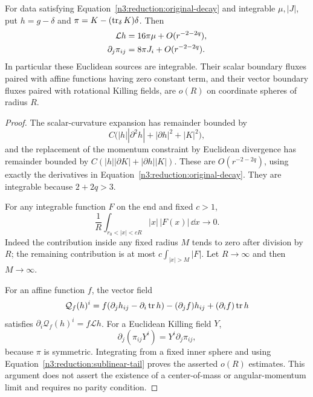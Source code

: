\begin{lemma}
\label{n3:reduction:moment-estimates}
For data satisfying Equation~\eqref{n3:reduction:original-decay} and
integrable $\mu,|J|$, put $h=g-\delta$ and
$\pi=K-(\operatorname{tr}_\delta K)\delta$.  Then
\begin{align}
 \mathcal Lh&=16\pi\mu+O(r^{-2-2q}),\notag\\
 \partial_j\pi_{ij}&=8\pi J_i+O(r^{-2-2q}).
       \label{n3:reduction:linear-source-integrability}
\end{align}
In particular these Euclidean sources are integrable.  Their scalar
boundary fluxes paired with affine functions having zero constant term,
and their vector boundary fluxes paired with rotational Killing fields,
are $o(R)$ on coordinate spheres of radius $R$.
\end{lemma}

\begin{proof}
The scalar-curvature expansion has remainder bounded by
\[
 C\bigl(|h||\partial^2h|+|\partial h|^2+|K|^2\bigr),
\]
and the replacement of the momentum constraint by Euclidean divergence
has remainder bounded by
$C(|h||\partial K|+|\partial h||K|)$.  These are
$O(r^{-2-2q})$, using exactly the derivatives in
Equation~\eqref{n3:reduction:original-decay}.  They are integrable because
$2+2q>3$.

For any integrable function $F$ on the end and fixed $c>1$,
\begin{equation}
 \label{n3:reduction:sublinear-tail}
 \frac1R\int_{r_0<|x|<cR}|x|\,|F(x)|\,\dd x\longrightarrow0.
\end{equation}
Indeed the contribution inside any fixed radius $M$ tends to zero
after division by $R$; the remaining contribution is at most
$c\int_{|x|>M}|F|$.  Let $R\to\infty$ and then $M\to\infty$.

For an affine function $f$, the vector field
\[
 \mathcal Q_f(h)^i
  =f(\partial_jh_{ij}-\partial_i\operatorname{tr} h)
       -(\partial_jf)h_{ij}+(\partial_if)\operatorname{tr} h
\]
satisfies $\partial_i\mathcal Q_f(h)^i=f\mathcal Lh$.
For a Euclidean Killing field $Y$,
\[
 \partial_j(\pi_{ij}Y^i)=Y^i\partial_j\pi_{ij},
\]
because $\pi$ is symmetric.  Integrating from a fixed inner sphere and
using Equation~\eqref{n3:reduction:sublinear-tail} proves the asserted
$o(R)$ estimates.  This argument does not assert the existence of a
center-of-mass or angular-momentum limit and requires no parity
condition.
\end{proof}

